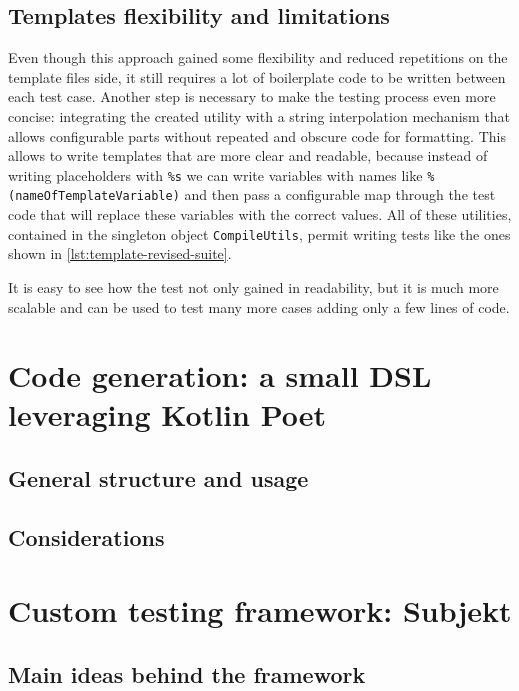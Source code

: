 \documentclass[12pt,a4paper,openright,twoside]{book}
\begin{document}
\subsection{Templates flexibility and limitations}

Even though this approach gained some flexibility and reduced repetitions on the
template files side, it still requires a lot of boilerplate code to be written
between each test case. Another step is necessary to make the testing process
even more concise: integrating the created utility with a string interpolation
mechanism that allows configurable parts without repeated and obscure code for
formatting. 
%
This allows to write templates that are more clear and readable, because instead
of writing placeholders with \lstinline{%s} we can write variables with names 
like \lstinline{%(nameOfTemplateVariable)} and then pass a configurable map 
through the test code that will replace these variables with the correct values.
All of these utilities, contained in the singleton object \lstinline{CompileUtils},
permit writing tests like the ones shown in \cref{lst:template-revised-suite}.
%

%
It is easy to see how the test not only gained in readability, but it is much
more scalable and can be used to test many more cases adding only a few lines of
code. 

\section{Code generation: a small DSL leveraging Kotlin Poet}

\subsection{General structure and usage}

\subsection{Considerations}

\section{Custom testing framework: Subjekt}

\subsection{Main ideas behind the framework}
\end{document}
